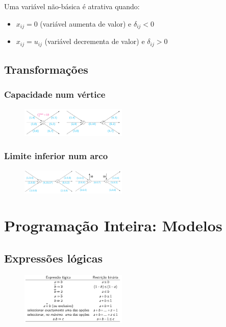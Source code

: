 \documentclass[10pt, a4paper]{article}
\begin{document}
\begin{multicols}{2}
Uma variável não-básica é atrativa quando:
\begin{itemize}
    \item \(x_{ij} = 0\) (variável aumenta de valor) e \(\delta_{ij} < 0\)
    \item \(x_{ij} = u_{ij}\) (variável decrementa de valor) e \(\delta_{ij} > 0\)
\end{itemize}

\subsection{Transformações}

\subsubsection{Capacidade num vértice}

\begin{figure}[H]
    \centering
    \includegraphics[width=0.45\textwidth]{cap_vertice.png}
\end{figure}

\subsubsection{Limite inferior num arco}

\begin{figure}[H]
    \centering
    \includegraphics[width=0.45\textwidth]{limites.png}
\end{figure}



\section{Programação Inteira: Modelos}
\thispagestyle{empty}

\subsection{Expressões lógicas}

\begin{figure}[H]
    \centering
    \includegraphics[width=0.45\textwidth]{expr_logicas.png}
\end{figure}



\end{multicols}
\end{document}
